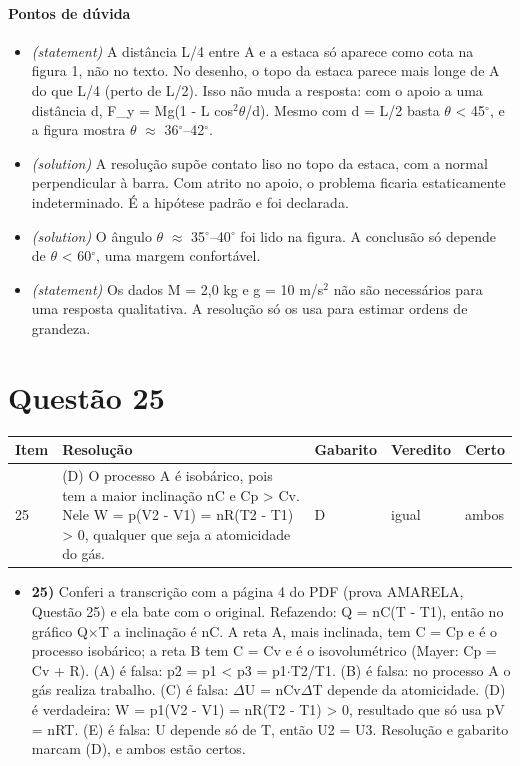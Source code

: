 \documentclass{article}%
\begin{document}
\paragraph{Pontos de dúvida}%
\begin{itemize}%
\item%
\textit{(statement)} A distância L/4 entre A e a estaca só aparece como cota na figura 1, não no texto. No desenho, o topo da estaca parece mais longe de A do que L/4 (perto de L/2). Isso não muda a resposta: com o apoio a uma distância d, F\_y = Mg(1 - L cos$^2$$\theta$/d). Mesmo com d = L/2 basta $\theta$ < 45$^\circ$, e a figura mostra $\theta$ $\approx$ 36$^\circ$--42$^\circ$.%
\item%
\textit{(solution)} A resolução supõe contato liso no topo da estaca, com a normal perpendicular à barra. Com atrito no apoio, o problema ficaria estaticamente indeterminado. É a hipótese padrão e foi declarada.%
\item%
\textit{(solution)} O ângulo $\theta$ $\approx$ 35$^\circ$--40$^\circ$ foi lido na figura. A conclusão só depende de $\theta$ < 60$^\circ$, uma margem confortável.%
\item%
\textit{(statement)} Os dados M = 2,0 kg e g = 10 m/s$^2$ não são necessários para uma resposta qualitativa. A resolução só os usa para estimar ordens de grandeza.%
\end{itemize}%
\section*{Questão 25}%
\begin{longtable}{@{}p{} p{} p{} p{} p{}@{}}\toprule Item & Resolução & Gabarito & Veredito & Certo \\ \midrule
25 & (D) O processo A é isobárico, pois tem a maior inclinação nC e Cp > Cv. Nele W = p(V2 - V1) = nR(T2 - T1) > 0, qualquer que seja a atomicidade do gás. & D & igual & ambos \\
\bottomrule\end{longtable}%
\begin{itemize}%
\item%
\textbf{25)} Conferi a transcrição com a página 4 do PDF (prova AMARELA, Questão 25) e ela bate com o original. Refazendo: Q = nC(T - T1), então no gráfico Q$\times$T a inclinação é nC. A reta A, mais inclinada, tem C = Cp e é o processo isobárico; a reta B tem C = Cv e é o isovolumétrico (Mayer: Cp = Cv + R). (A) é falsa: p2 = p1 < p3 = p1$\cdot$T2/T1. (B) é falsa: no processo A o gás realiza trabalho. (C) é falsa: $\Delta$U = nCv$\Delta$T depende da atomicidade. (D) é verdadeira: W = p1(V2 - V1) = nR(T2 - T1) > 0, resultado que só usa pV = nRT. (E) é falsa: U depende só de T, então U2 = U3. Resolução e gabarito marcam (D), e ambos estão certos.%
\end{itemize}%
\end{document}
